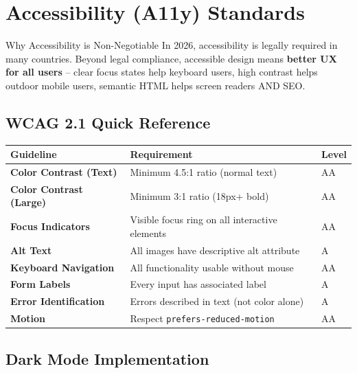 \documentclass[12pt,a4paper]{article}
\begin{document}
\newpage

\section{Accessibility (A11y) Standards}

\begin{infobox}{Why Accessibility is Non-Negotiable}
In 2026, accessibility is legally required in many countries. Beyond legal compliance, accessible design means \textbf{better UX for all users} -- clear focus states help keyboard users, high contrast helps outdoor mobile users, semantic HTML helps screen readers AND SEO.
\end{infobox}

\subsection{WCAG 2.1 Quick Reference}

\begin{center}
\begin{tabularx}{\textwidth}{|>{\bfseries}l|X|>{\centering\arraybackslash}p{2cm}|}
\hline
\rowcolor{FaranDark}
\color{white}\textbf{Guideline} & \color{white}\textbf{Requirement} & \color{white}\textbf{Level} \\
\hline
Color Contrast (Text) & Minimum 4.5:1 ratio (normal text) & AA \\
\hline
\rowcolor{SectionBg}
Color Contrast (Large) & Minimum 3:1 ratio (18px+ bold) & AA \\
\hline
Focus Indicators & Visible focus ring on all interactive elements & AA \\
\hline
\rowcolor{SectionBg}
Alt Text & All images have descriptive alt attribute & A \\
\hline
Keyboard Navigation & All functionality usable without mouse & AA \\
\hline
\rowcolor{SectionBg}
Form Labels & Every input has associated label & A \\
\hline
Error Identification & Errors described in text (not color alone) & A \\
\hline
\rowcolor{SectionBg}
Motion & Respect \texttt{prefers-reduced-motion} & AA \\
\hline
\end{tabularx}
\end{center}

\subsection{Dark Mode Implementation}
\end{document}
